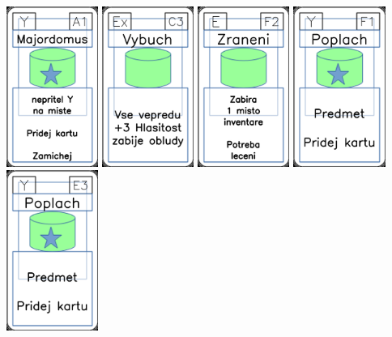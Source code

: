 \documentclass[a4paper]{article}
\begin{document}
	\includegraphics[width=3.0cm]{img-5_30}
	\includegraphics[width=3.0cm]{img-4_12}
	\includegraphics[width=3.0cm]{img-4_56}
	\includegraphics[width=3.0cm]{img-5_25}
	\includegraphics[width=3.0cm]{img-5_22}
\end{document}
